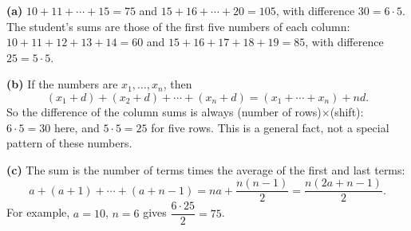\textbf{(a)} $10+11+\cdots+15=75$ and $15+16+\cdots+20=105$, with difference $30=6\cdot5$. The student's sums are those of the first five numbers of each column: $10+11+12+13+14=60$ and $15+16+17+18+19=85$, with difference $25=5\cdot5$.

\textbf{(b)} If the numbers are $x_1,\dots,x_n$, then
\[(x_1+d)+(x_2+d)+\cdots+(x_n+d)=(x_1+\cdots+x_n)+nd.\]
So the difference of the column sums is always (number of rows)$\times$(shift): $6\cdot5=30$ here, and $5\cdot5=25$ for five rows. This is a general fact, not a special pattern of these numbers.

\textbf{(c)} The sum is the number of terms times the average of the first and last terms:
\[a+(a+1)+\cdots+(a+n-1)=na+\dfrac{n(n-1)}{2}=\boxed{\dfrac{n(2a+n-1)}{2}}.\]
For example, $a=10$, $n=6$ gives $\dfrac{6\cdot25}{2}=75$.
